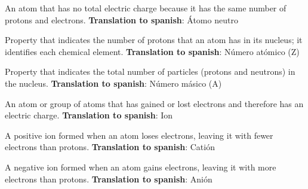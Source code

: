 \begin{vocabulary}
      An atom that has no total electric charge because it has the same number of protons and electrons. \newline
       \textbf{Translation to spanish}: Átomo neutro \newline
\end{vocabulary}

\begin{vocabulary}
      Property that indicates the number of protons that an atom has in its nucleus; it identifies each chemical element. \newline
       \textbf{Translation to spanish}: Número atómico (Z) \newline
\end{vocabulary}

\begin{vocabulary}
      Property that indicates the total number of particles (protons and neutrons) in the nucleus. \newline
       \textbf{Translation to spanish}: Número másico (A) \newline
\end{vocabulary}

\begin{vocabulary}[Ion]
      An atom or group of atoms that has gained or lost electrons and therefore has an electric charge. \newline
       \textbf{Translation to spanish}: Ion \newline
\end{vocabulary}

\begin{vocabulary}[Cation]
      A positive ion formed when an atom loses electrons, leaving it with fewer electrons than protons. \newline
       \textbf{Translation to spanish}: Catión \newline
\end{vocabulary}

\begin{vocabulary}[Anion]
      A negative ion formed when an atom gains electrons, leaving it with more electrons than protons. \newline
       \textbf{Translation to spanish}: Anión \newline
\end{vocabulary}

